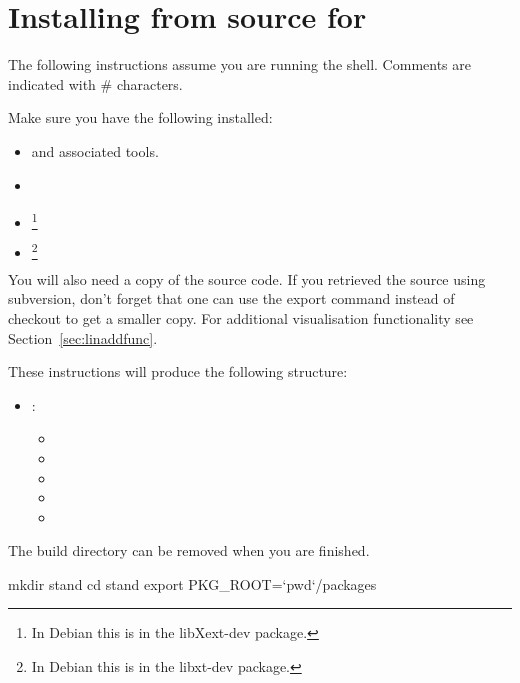 
%
%
%

\section{Installing from source for \linux}
\label{sec:srclinux}
The following instructions assume you are running the  shell.
Comments are indicated with \# characters.

Make sure you have the following installed:
\begin{itemize}
 \item {} and associated tools.
\item {}
\item {}\footnote{In Debian this is in the libXext-dev package.}
\item {}\footnote{In Debian this is in the libxt-dev package.}
\end{itemize}

You will also need a copy of the \esfinley source code.
If you retrieved the source using subversion, don't forget that one can use the export command instead of checkout to get a smaller copy.
For additional visualisation functionality see Section~\ref{sec:linaddfunc}.

These instructions will produce the following structure:
\begin{itemize}
\item {}: \begin{itemize}
 \item {}
\item {}
\item {}
\item {}
\item {}
  \end{itemize}
\end{itemize}

The build directory can be removed when you are finished.

\begin{shellCode}
mkdir stand
cd stand
export PKG_ROOT=`pwd`/packages
\end{shellCode}

